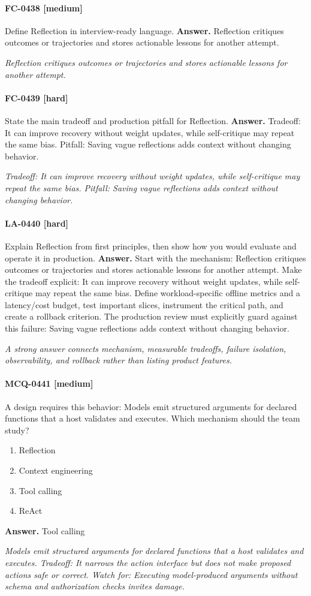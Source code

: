 \paragraph{FC-0438 [medium]} Define Reflection in interview-ready language.
\noindent\textbf{Answer.} Reflection critiques outcomes or trajectories and stores actionable lessons for another attempt.
\par\textit{Reflection critiques outcomes or trajectories and stores actionable lessons for another attempt.}
\paragraph{FC-0439 [hard]} State the main tradeoff and production pitfall for Reflection.
\noindent\textbf{Answer.} Tradeoff: It can improve recovery without weight updates, while self-critique may repeat the same bias. Pitfall: Saving vague reflections adds context without changing behavior.
\par\textit{Tradeoff: It can improve recovery without weight updates, while self-critique may repeat the same bias. Pitfall: Saving vague reflections adds context without changing behavior.}
\paragraph{LA-0440 [hard]} Explain Reflection from first principles, then show how you would evaluate and operate it in production.
\noindent\textbf{Answer.} Start with the mechanism: Reflection critiques outcomes or trajectories and stores actionable lessons for another attempt. Make the tradeoff explicit: It can improve recovery without weight updates, while self-critique may repeat the same bias. Define workload-specific offline metrics and a latency/cost budget, test important slices, instrument the critical path, and create a rollback criterion. The production review must explicitly guard against this failure: Saving vague reflections adds context without changing behavior.
\par\textit{A strong answer connects mechanism, measurable tradeoffs, failure isolation, observability, and rollback rather than listing product features.}
\paragraph{MCQ-0441 [medium]} A design requires this behavior: Models emit structured arguments for declared functions that a host validates and executes. Which mechanism should the team study?
\begin{enumerate}[label=\Alph*.]
\item Reflection
\item Context engineering
\item Tool calling
\item ReAct
\end{enumerate}
\noindent\textbf{Answer.} Tool calling
\par\textit{Models emit structured arguments for declared functions that a host validates and executes. Tradeoff: It narrows the action interface but does not make proposed actions safe or correct. Watch for: Executing model-produced arguments without schema and authorization checks invites damage.}
